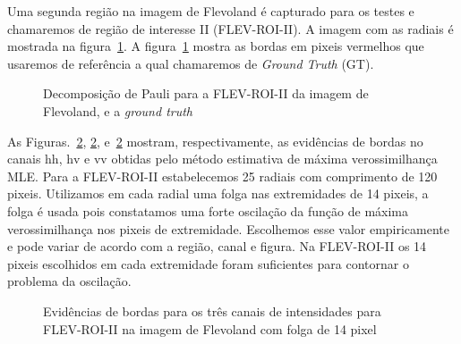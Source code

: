 
Uma segunda região na imagem de Flevoland é capturado para os testes e chamaremos de região de interesse II (FLEV-ROI-II). A imagem com as radiais é mostrada na figura~\ref{roi_gt_roi_ii}. A figura~\ref{roi_gt_roi_ii} mostra as bordas em pixeis vermelhos que usaremos de referência a qual chamaremos de \textit{Ground Truth} (GT).
\begin{figure}[hbt]
   \centering
    \caption{Decomposição de Pauli para a FLEV-ROI-II da imagem de Flevoland, e a \textit{ground truth}}
    \label{roi_gt_roi_ii}
\end{figure}

As Figuras.~\ref{evidencias_flev_roi_ii_hh_hv_vv}, \ref{evidencias_flev_roi_ii_hh_hv_vv}, e~\ref{evidencias_flev_roi_ii_hh_hv_vv} mostram, respectivamente, as evidências de bordas no canais $\text{hh}$, $\text{hv}$ e $\text{vv}$ obtidas pelo método estimativa de máxima verossimilhança MLE. Para a FLEV-ROI-II estabelecemos 25 radiais com comprimento de 120 pixeis. Utilizamos em cada radial uma folga nas extremidades de  14 pixeis, a folga é usada pois constatamos uma forte oscilação da função de máxima verossimilhança nos pixeis de extremidade. Escolhemos esse valor empiricamente e pode variar de acordo com a região, canal e figura. Na FLEV-ROI-II os 14 pixeis escolhidos em cada extremidade foram suficientes para contornar o problema da oscilação.

   \begin{figure}[hbt]
	\centering
     \caption{Evidências de bordas para os três canais de intensidades para FLEV-ROI-II na imagem de Flevoland com folga de 14 pixel}
     \label{evidencias_flev_roi_ii_hh_hv_vv} 
   \end{figure}

